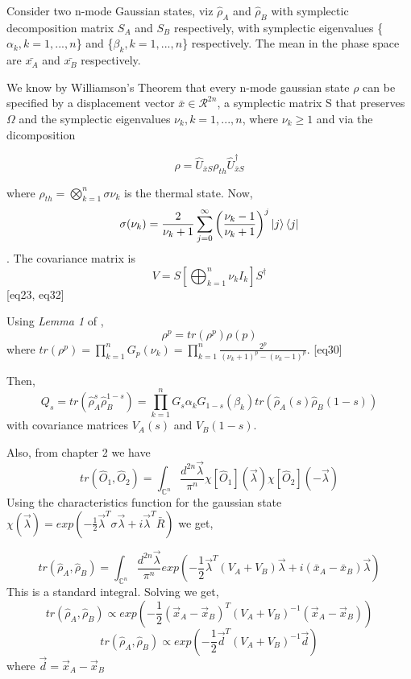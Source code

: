 Consider two n-mode Gaussian states, viz $\hat{\rho}_A$ and $\hat{\rho}_B$ with symplectic decomposition matrix $S_A$ and $S_B$ respectively, with symplectic eigenvalues \{$\alpha_k, k = 1, ..., n$\} and \{$\beta_k, k = 1, ..., n$\} respectively. The mean in the phase space are $\bar{x_A}$ and $\bar{x_B}$ respectively.

We know by Williamson's Theorem that every n-mode gaussian state $\rho$ can be specified by a displacement vector $\bar{x} \in \mathcal{R}^{2n}$, a symplectic matrix S that preserves $\Omega$ and the symplectic eigenvalues ${\nu_k, k = 1,...,n}$, where $\nu_k \ge 1$ and via the dicomposition

$$\rho = \hat{U}_{\bar{x}S} \rho_{th} \hat{U}_{\bar{x}S}^\dag$$

where $\rho_{th} = \bigotimes_{k=1}^n \sigma{\nu_k}$ is the thermal state. Now, $$\sigma(\nu_k) = \frac{2}{\nu_k + 1} \sum_{j = 0}^{\infty} \left(\frac{\nu_k - 1}{\nu_k + 1}\right)^j \ket{j} \bra{j}$$. The covariance matrix is $$V = S \left[\bigoplus_{k=1}^n \nu_k I_k\right]S^\dag$$\cite{gaussian_states}[eq23, eq32]

Using \textit{Lemma 1} of \cite{gaussian_states}, $$\rho^p = tr(\rho^p) \rho(p)$$ where $tr(\rho^p) = \prod_{k=1}^n G_p(\nu_k) = \prod_{k=1}^n \frac{2^p}{(\nu_k + 1)^p - (\nu_k - 1)^p}$. \cite{gaussian_states}[eq30]

Then,
\begin{equation}
    Q_s = tr(\hat{\rho}_A^s \hat{\rho}_B^{1 - s}) = \prod_{k=1}^{n} G_s{\alpha_k} G_{1 - s}(\beta_k) tr(\hat{\rho}_A(s) \hat{\rho}_B(1 - s))
\end{equation}
with covariance matrices $V_A(s)$ and $V_B(1 - s)$.

Also, from chapter 2 we have $$tr(\hat{O}_1, \hat{O}_2) = \int_{\mathbb{C}^n} \frac{d^{2n}\vec{\lambda}}{\pi^n} \chi[\hat{O}_1](\vec{\lambda})\chi[\hat{O}_2](-\vec{\lambda})$$
Using the characteristics function for the gaussian state $\chi(\vec{\lambda}) = exp(-\frac{1}{2}\vec{\lambda}^T \sigma \vec{\lambda} + i\vec{\lambda}^T \bar{R})$ we get,

\begin{equation}
    tr(\hat{\rho}_A, \hat{\rho}_B) = \int_{\mathbb{C}^n} \frac{d^{2n}\vec{\lambda}}{\pi^n} exp\left(-\frac{1}{2}\vec{\lambda}^T(V_A + V_B) \vec{\lambda} + i (\bar{x}_A - \bar{x}_B) \vec{\lambda}\right)
\end{equation}
This is a standard integral. Solving we get,
$$tr(\hat{\rho}_A, \hat{\rho}_B) \propto exp\left(-\frac{1}{2}(\vec{x}_A - \vec{x}_B)^T(V_A + V_B)^{-1} (\vec{x}_A - \vec{x}_B)\right)$$
$$tr(\hat{\rho}_A, \hat{\rho}_B) \propto exp\left(-\frac{1}{2}\vec{d}^T(V_A + V_B)^{-1} \vec{d}\right)$$
where $\vec{d} = \vec{x}_A - \vec{x}_B$

